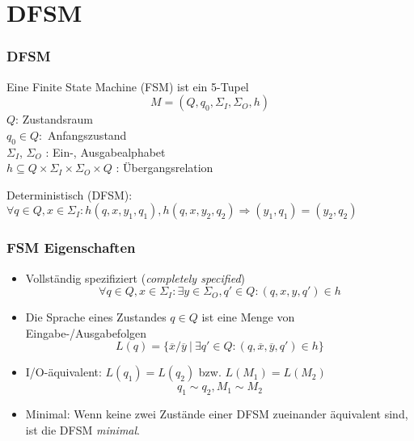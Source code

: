 \section{DFSM}
\begin{frame}
  \frametitle{DFSM}

  \begin{definition}
    Eine Finite State Machine (FSM) ist ein 5-Tupel $$M=(Q,q_0,\Sigma_I,\Sigma_O,h)$$
    $Q$: Zustandsraum\\
    $q_0\in Q:$ Anfangszustand\\
    $\Sigma_I$, $\Sigma_O$ : Ein-, Ausgabealphabet\\
    $h \subseteq Q \times \Sigma_I \times \Sigma_O \times Q$ : Übergangsrelation 
  \end{definition}
  Deterministisch (DFSM): $\forall q \in Q, x \in \Sigma_I: h(q,x,y_1,q_1),h(q,x,y_2,q_2) \Rightarrow (y_1, q_1) = (y_2, q_2)$
\end{frame}

\begin{frame}
\frametitle{FSM Eigenschaften}
\begin{itemize}
  \item Vollständig spezifiziert (\emph{completely specified})$$\forall q\in Q, x\in \Sigma_I : \exists y \in \Sigma_O, q'\in Q : (q,x,y,q')\in h$$
  \item Die Sprache eines Zustandes $q \in Q$ ist eine Menge von Eingabe-/Aus\-gabefolgen $$L(q)= \{\overline{x}/\overline{y} ~|~ \exists q' \in Q : (q,\overline{x}, \overline{y}, q') \in h \}$$
  \item I/O-äquivalent: $L(q_1) = L(q_2)$ bzw. $L(M_1) = L(M_2)$ $$q_1 \sim q_2, M_1 \sim M_2$$
  \item Minimal: Wenn keine zwei Zustände einer DFSM zueinander äquivalent sind, ist die DFSM \emph{minimal}.
\end{itemize}
\end{frame}